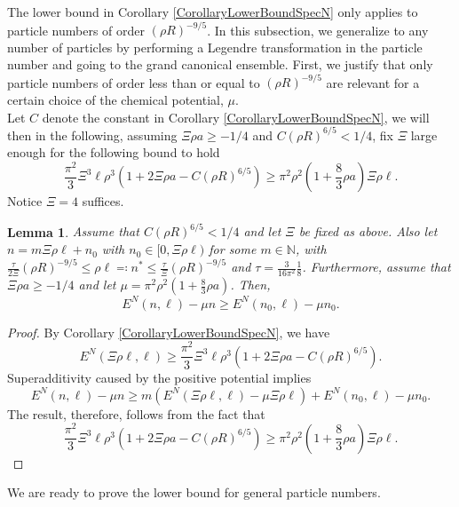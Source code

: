 \documentclass[a4paper,11pt]{article}
\newtheorem{lemma}[theorem]{Lemma}
\numberwithin{equation}{section}
\begin{document}
	The lower bound in Corollary \ref{CorollaryLowerBoundSpecN} only applies to particle numbers of order $ (\rho R)^{-9/5} $. In this subsection, we generalize to any number of particles by performing a Legendre transformation in the particle number and going to the grand canonical ensemble. First, we justify that only particle numbers of order less than or equal to $ (\rho R)^{-9/5} $ are relevant for a certain choice of the chemical potential, $ \mu $.\\
	Let $C$ denote the constant in Corollary \ref{CorollaryLowerBoundSpecN}, we will then in the following, assuming $\Xi \rho a\geq -1/4$ and $C(\rho R)^{6/5}<  1/4$, fix $\Xi$ large enough for the following bound to hold $$
	\frac{\pi^2}{3}\Xi^3\ell\rho^3\left(1+2 \Xi\rho a-C(\rho R)^{6/5}\right)\geq \pi^2\rho^2\left(1+\frac{8}{3}\rho a\right) \Xi\rho\ell.
	$$
	Notice $\Xi=4$ suffices.
	\begin{lemma}\label{LemmaLocalizationFbound}
		Assume that $ C(\rho R)^{6/5}<  1/4 $ and let $ \Xi$ be fixed as above. Also let $ n=m\Xi \rho \ell+n_0 $ with $ n_0\in[0,\Xi\rho \ell) $ for some $ m\in\mathbb{N} $, with $\frac{\tau}{2\Xi} (\rho R)^{-9/5} \leq \rho\ell\eqqcolon n^{\ast}\leq \frac{\tau}{\Xi} (\rho R)^{-9/5} $ and $ \tau=\frac{3}{16\pi^2}\frac{1}{8} $. Furthermore, assume that $\Xi \rho a \geq-1/4$ and let $ \mu=\pi^2\rho^2\left(1+\frac{8}{3}\rho a\right) $. Then,  \begin{equation}
			E^{N}(n,\ell)-\mu n \geq E^{N}(n_0,\ell)-\mu n_0.
		\end{equation}
	\end{lemma}
	\begin{proof}
		By Corollary \ref{CorollaryLowerBoundSpecN}, we have \begin{equation}
			E^{N}(\Xi\rho\ell,\ell)\geq\frac{\pi^2}{3}\Xi^3\ell\rho^3\left(1+2\Xi\rho a-C(\rho R)^{6/5}\right).
		\end{equation}
		Superadditivity caused by the positive potential implies \begin{equation}
			E^N(n,\ell)-\mu n\geq m\left(E^N(\Xi\rho\ell,\ell)-\mu\Xi\rho\ell \right)+E^N(n_0,\ell)-\mu n_0.
		\end{equation}
		The result, therefore, follows from the fact that \begin{equation}
			\frac{\pi^2}{3}\Xi^3\ell\rho^3\left(1+2\Xi\rho a-C(\rho R)^{6/5}\right)\geq \pi^2\rho^2\left(1+\frac{8}{3}\rho a\right) \Xi\rho\ell.
		\end{equation}
	\end{proof}
	We are ready to prove the lower bound for general particle numbers.
\end{document}
